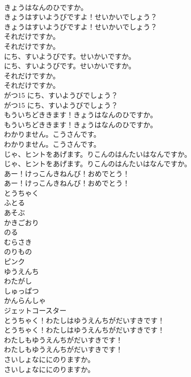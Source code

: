 \documentclass[8pt]{extreport}
\begin{document}
\begin{CJK}{UTF8}{min}
\\	きょうはなんのひですか。 
\\	きょうはすいようびですよ！せいかいでしょう？	
\\	きょうはすいようびですよ！せいかいでしょう？ 
\\	それだけですか。	
\\	それだけですか。 
\\	にち、すいようびです。せいかいですか。	
\\	にち、すいようびです。せいかいですか。 
\\	それだけですか。	
\\	それだけですか。 
\\	がつ15 にち、すいようびでしょう？	
\\	がつ15 にち、すいようびでしょう？ 
\\	もういちどききます！きょうはなんのひですか。	
\\	もういちどききます！きょうはなんのひですか。 
\\	わかりません。こうさんです。	
\\	わかりません。こうさんです。 
\\	じゃ、ヒントをあげます。りこんのはんたいはなんですか。	
\\	じゃ、ヒントをあげます。りこんのはんたいはなんですか。 
\\	あー！けっこんきねんび！おめでとう！	
\\	あー！けっこんきねんび！おめでとう！ 
\\	とうちゃく
\\	ふとる
\\	あそぶ
\\	かきごおり
\\	のる
\\	むらさき
\\	のりもの
\\	ピンク
\\	ゆうえんち
\\	わたがし
\\	しゅっぱつ
\\	かんらんしゃ
\\	ジェットコースター
\\	とうちゃく！わたしはゆうえんちがだいすきです！	
\\	とうちゃく！わたしはゆうえんちがだいすきです！ 
\\	わたしもゆうえんちがだいすきです！	
\\	わたしもゆうえんちがだいすきです！ 
\\	さいしょなににのりますか。	
\\	さいしょなににのりますか。 

\end{CJK}
\end{document}
